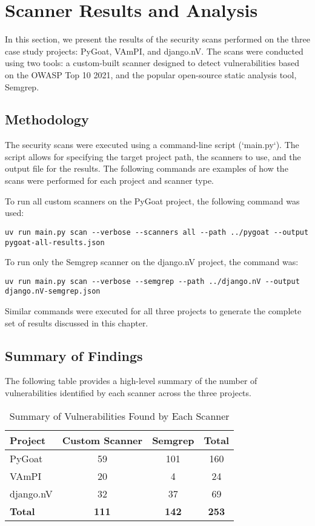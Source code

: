 
\section{Scanner Results and Analysis}
In this section, we present the results of the security scans performed on the three case study projects: PyGoat, VAmPI, and django.nV. The scans were conducted using two tools: a custom-built scanner designed to detect vulnerabilities based on the OWASP Top 10 2021, and the popular open-source static analysis tool, Semgrep.

\subsection{Methodology}

The security scans were executed using a command-line script (`main.py`). The script allows for specifying the target project path, the scanners to use, and the output file for the results. The following commands are examples of how the scans were performed for each project and scanner type.

To run all custom scanners on the PyGoat project, the following command was used:
\begin{verbatim}
uv run main.py scan --verbose --scanners all --path ../pygoat --output pygoat-all-results.json
\end{verbatim}

To run only the Semgrep scanner on the django.nV project, the command was:
\begin{verbatim}
uv run main.py scan --verbose --semgrep --path ../django.nV --output django.nV-semgrep.json
\end{verbatim}

Similar commands were executed for all three projects to generate the complete set of results discussed in this chapter.

\subsection{Summary of Findings}

The following table provides a high-level summary of the number of vulnerabilities identified by each scanner across the three projects.

\begin{table}[h!]
\centering
\caption{Summary of Vulnerabilities Found by Each Scanner}
\label{tab:summary_findings}
\begin{tabular}{|l|c|c|c|}
\hline
\textbf{Project} & \textbf{Custom Scanner} & \textbf{Semgrep} & \textbf{Total} \\
\hline
PyGoat & 59 & 101 & 160 \\
\hline
VAmPI & 20 & 4 & 24 \\
\hline
django.nV & 32 & 37 & 69 \\
\hline
\textbf{Total} & \textbf{111} & \textbf{142} & \textbf{253} \\
\hline
\end{tabular}
\end{table}


